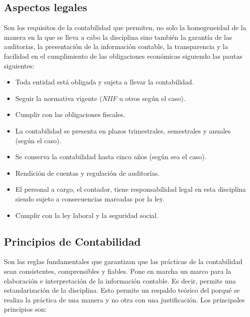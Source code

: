 \documentclass[letterpaper, 12pt]{article}
\begin{document}
	\subsection*{Aspectos legales}
	
		Son los requisitos de la contabilidad que permiten, no solo la homogeneidad de la manera en la que se lleva a cabo la disciplina sino también la garantía de las auditorías, la presentación de la información contable, la transparencia y la facilidad en el cumplimiento de las obligaciones económicas siguiendo las pautas siguientes:
		
		\begin{itemize}

		\item Toda entidad está obligada y sujeta a llevar la contabilidad.
		\item Seguir la normativa vigente (\emph{NIIF} u otros según el caso).
		\item Cumplir con las obligaciones fiscales.
		\item La contabilidad se presenta en plazos trimestrales, semestrales y anuales (según el caso).
		\item Se conserva la contabilidad hasta cinco años (según sea el caso).
		\item Rendición de cuentas y regulación de auditorías.
		\item El personal a cargo, el contador, tiene responsabilidad legal en esta disciplina siendo sujeto a consecuencias marcadas por la ley.
		\item Cumplir con la ley laboral y la seguridad social.

		\end{itemize}
	
	\subsection*{Principios de Contabilidad}
	
		Son las reglas fundamentales que garantizan que las prácticas de la contabilidad sean consistentes, comprensibles y fiables. Pone en marcha un marco para la elaboración e interpretación de la información contable. Es decir, permite una estandarización de la disciplina. Esto permite un respaldo teórico del porqué se realiza la práctica de una manera y no otra con una justificación. Los principales principios son:
		
\end{document}
